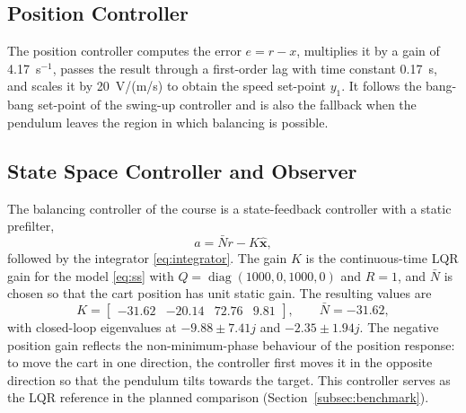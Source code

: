 \subsection{Position Controller}
\label{subsec:poscontrol}

The position controller computes the error $e = r - x$, multiplies it by a
gain of 4.17~s$^{-1}$, passes the result through a first-order lag with time
constant 0.17~s, and scales it by 20~V/(m/s) to obtain the speed set-point
$y_1$. It follows the bang-bang set-point of the swing-up controller and is
also the fallback when the pendulum leaves the region in which balancing is
possible.

\subsection{State Space Controller and Observer}
\label{subsec:lqr}

The balancing controller of the course is a state-feedback controller with a
static prefilter,
\begin{equation}
  a = \bar{N}r - K\hat{\mathbf{x}},
  \label{eq:lqr}
\end{equation}
followed by the integrator \eqref{eq:integrator}. The gain $K$ is the
continuous-time \ac{LQR} gain for the model \eqref{eq:ss} with
$Q = \operatorname{diag}(1000, 0, 1000, 0)$ and $R = 1$, and $\bar{N}$ is chosen
so that the cart position has unit static gain. The resulting values are
\begin{equation}
  K = \begin{bmatrix} -31.62 & -20.14 & 72.76 & 9.81 \end{bmatrix}, \qquad
  \bar{N} = -31.62,
  \label{eq:Kvalues}
\end{equation}
with closed-loop eigenvalues at $-9.88 \pm 7.41j$ and $-2.35 \pm 1.94j$. The
negative position gain reflects the non-minimum-phase behaviour of the
position response: to move the cart in one direction, the controller first
moves it in the opposite direction so that the pendulum tilts towards the
target. This controller serves as the \ac{LQR} reference in the planned
comparison (Section~\ref{subsec:benchmark}).

